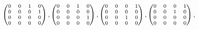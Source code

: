 \documentclass[11pt]{article}
\begin{document}
                   \vspace{-2mm}                         
$ \hspace{13mm} \scriptsize{         \begin{pmatrix}
                        0&0&1&0\\
                        0&0&0&1\\
                        0&0&0&0\\
                        0&0&0&0\\
                        \end{pmatrix},
                       \begin{pmatrix}
                        0&0&1&0\\
                        0&0&0&0\\
                        0&0&0&1\\
                        0&0&0&0\\
                        \end{pmatrix},
                        \begin{pmatrix}
                        0&0&0&1\\
                        0&0&0&0\\
                        0&0&1&0\\
                        0&0&0&0\\
                        \end{pmatrix},
                        \begin{pmatrix}
                        0&0&0&1\\
                        0&0&1&0\\
                        0&0&0&0\\
                        0&0&0&0\\
                        \end{pmatrix},}$\\[4pt]
         
\end{document}
